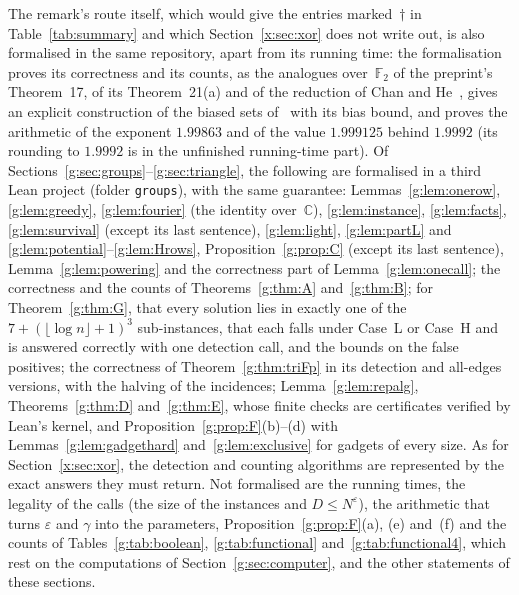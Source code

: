 \documentclass[11pt]{article}
\theoremstyle{definition}
\theoremstyle{remark}
\begin{document}
The remark's route itself, which would give the entries marked~$\dagger$ in Table~\ref{tab:summary} and which Section~\ref{x:sec:xor} does not write out, is also formalised in the same repository, apart from its running time: the formalisation proves its correctness and its counts, as the analogues over~$\mathbb F_2$ of the preprint's Theorem~17, of its Theorem~21(a) and of the reduction of Chan and He~\cite{CH20}, gives an explicit construction of the biased sets of~\cite{AGHP92} with its bias bound, and proves the arithmetic of the exponent $1.99863$ and of the value $1.999125$ behind $1.9992$ (its rounding to $1.9992$ is in the unfinished running-time part). Of Sections~\ref{g:sec:groups}--\ref{g:sec:triangle}, the following are formalised in a third Lean project (folder \texttt{groups}), with the same guarantee: Lemmas~\ref{g:lem:onerow}, \ref{g:lem:greedy}, \ref{g:lem:fourier} (the identity over~$\mathbb C$), \ref{g:lem:instance}, \ref{g:lem:facts}, \ref{g:lem:survival} (except its last sentence), \ref{g:lem:light}, \ref{g:lem:partL} and \ref{g:lem:potential}--\ref{g:lem:Hrows}, Proposition~\ref{g:prop:C} (except its last sentence), Lemma~\ref{g:lem:powering} and the correctness part of Lemma~\ref{g:lem:onecall}; the correctness and the counts of Theorems~\ref{g:thm:A} and~\ref{g:thm:B}; for Theorem~\ref{g:thm:G}, that every solution lies in exactly one of the $7+(\lfloor\log n\rfloor+1)^3$ sub-instances, that each falls under Case~L or Case~H and is answered correctly with one detection call, and the bounds on the false positives; the correctness of Theorem~\ref{g:thm:triFp} in its detection and all-edges versions, with the halving of the incidences; Lemma~\ref{g:lem:repalg}, Theorems~\ref{g:thm:D} and~\ref{g:thm:E}, whose finite checks are certificates verified by Lean's kernel, and Proposition~\ref{g:prop:F}(b)--(d) with Lemmas~\ref{g:lem:gadgethard} and~\ref{g:lem:exclusive} for gadgets of every size. As for Section~\ref{x:sec:xor}, the detection and counting algorithms are represented by the exact answers they must return. Not formalised are the running times, the legality of the calls (the size of the instances and $D\le N^\varepsilon$), the arithmetic that turns $\varepsilon$ and $\gamma$ into the parameters, Proposition~\ref{g:prop:F}(a), (e) and~(f) and the counts of Tables~\ref{g:tab:boolean}, \ref{g:tab:functional} and~\ref{g:tab:functional4}, which rest on the computations of Section~\ref{g:sec:computer}, and the other statements of these sections.

\FloatBarrier
\appendix
\end{document}

